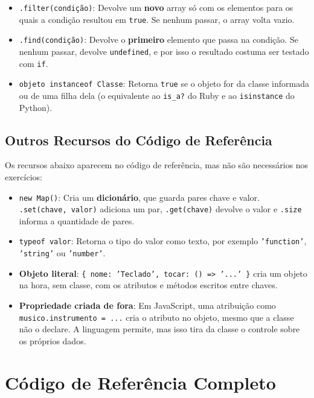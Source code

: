 \begin{itemize}
    \item \texttt{.filter(condição)}: Devolve um \textbf{novo} array só com os elementos para os
    quais a condição resultou em \texttt{true}. Se nenhum passar, o array volta vazio.

    \item \texttt{.find(condição)}: Devolve o \textbf{primeiro} elemento que passa na condição.
    Se nenhum passar, devolve \texttt{undefined}, e por isso o resultado costuma ser testado com
    \texttt{if}.

    \item \texttt{objeto instanceof Classe}: Retorna \texttt{true} se o objeto for da classe
    informada ou de uma filha dela (o equivalente ao \texttt{is\_a?} do Ruby e ao
    \texttt{isinstance} do Python).
\end{itemize}

\subsection{Outros Recursos do Código de Referência}

Os recursos abaixo aparecem no código de referência, mas não são necessários nos exercícios:

\begin{itemize}
    \item \texttt{new Map()}: Cria um \textbf{dicionário}, que guarda pares chave e valor.
    \texttt{.set(chave, valor)} adiciona um par, \texttt{.get(chave)} devolve o valor e
    \texttt{.size} informa a quantidade de pares.

    \item \texttt{typeof valor}: Retorna o tipo do valor como texto, por exemplo
    \texttt{'function'}, \texttt{'string'} ou \texttt{'number'}.

    \item \textbf{Objeto literal}: \texttt{\{ nome: 'Teclado', tocar: () => '...' \}} cria um
    objeto na hora, sem classe, com os atributos e métodos escritos entre chaves.

    \item \textbf{Propriedade criada de fora}: Em JavaScript, uma atribuição como
    \texttt{musico.instrumento = ...} cria o atributo no objeto, mesmo que a classe não o
    declare. A linguagem permite, mas isso tira da classe o controle sobre os próprios dados.
\end{itemize}

\section{Código de Referência Completo}

